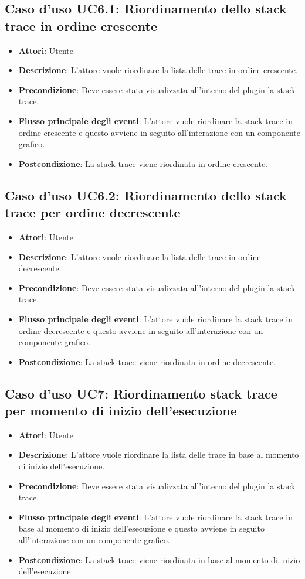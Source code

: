\subsection{Caso d'uso UC6.1: Riordinamento dello stack trace in ordine crescente}
\begin{itemize}
	\item \textbf{Attori}: Utente
	\item \textbf{Descrizione}: L'attore vuole riordinare la lista delle trace in ordine crescente.
	\item \textbf{Precondizione}: Deve essere stata visualizzata all'interno del plugin la stack trace.
	\item \textbf{Flusso principale degli eventi}: L'attore vuole riordinare la stack trace in ordine crescente e questo avviene in seguito all'interazione con un componente grafico.
	\item \textbf{Postcondizione}: La stack trace viene riordinata in ordine crescente.
\end{itemize}
\subsection{Caso d'uso UC6.2: Riordinamento dello stack trace per ordine decrescente}
\begin{itemize}
	\item \textbf{Attori}: Utente
	\item \textbf{Descrizione}: L'attore vuole riordinare la lista delle trace in ordine decrescente.
	\item \textbf{Precondizione}: Deve essere stata visualizzata all'interno del plugin la stack trace.
	\item \textbf{Flusso principale degli eventi}: L'attore vuole riordinare la stack trace in ordine decrescente e questo avviene in seguito all'interazione con un componente grafico.
	\item \textbf{Postcondizione}: La stack trace viene riordinata in ordine decrescente.
\end{itemize}
\subsection{Caso d'uso UC7: Riordinamento stack trace per momento di inizio dell'esecuzione}
\begin{itemize}
	\item \textbf{Attori}: Utente
	\item \textbf{Descrizione}: L'attore vuole riordinare la lista delle trace in base al momento di inizio dell'esecuzione.
	\item \textbf{Precondizione}: Deve essere stata visualizzata all'interno del plugin la stack trace.
	\item \textbf{Flusso principale degli eventi}: L'attore vuole riordinare la stack trace in base al momento di inizio dell'esecuzione e questo avviene in seguito all'interazione con un componente grafico.
	\item \textbf{Postcondizione}: La stack trace viene riordinata in base al momento di inizio dell'esecuzione.
\end{itemize}
